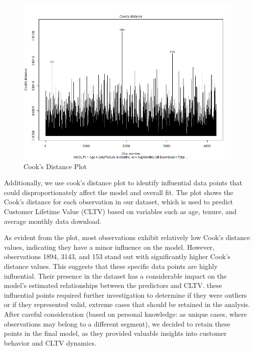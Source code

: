 \documentclass[
]{article}
\begin{document}
\begin{figure}

{\centering \includegraphics[width=0.8\linewidth]{Plots/cooks_distance} 

}

\caption{Cook's Distance Plot}\label{fig:cooks-distance-img}
\end{figure}

Additionally, we use cook's distance plot to identify influential data
points that could disproportionately affect the model and overall fit.
The plot shows the Cook's distance for each observation in our dataset,
which is used to predict Customer Lifetime Value (CLTV) based on
variables such as age, tenure, and average monthly data download.

As evident from the plot, most observations exhibit relatively low
Cook's distance values, indicating they have a minor influence on the
model. However, observations 1894, 3143, and 153 stand out with
significantly higher Cook's distance values. This suggests that these
specific data points are highly influential. Their presence in the
dataset has a considerable impact on the model's estimated relationships
between the predictors and CLTV. these influential points required
further investigation to determine if they were outliers or if they
represented valid, extreme cases that should be retained in the
analysis. After careful consideration (based on personal knowledge: as
unique cases, where observations may belong to a different segment), we
decided to retain these points in the final model, as they provided
valuable insights into customer behavior and CLTV dynamics.
\end{document}
